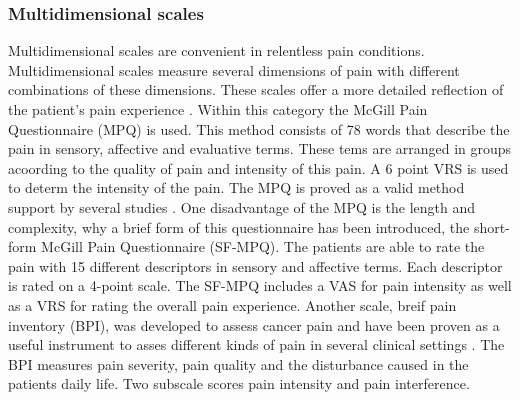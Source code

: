 \subsubsection{Multidimensional scales}
Multidimensional scales are convenient in relentless pain conditions. Multidimensional scales measure several dimensions of pain with different combinations of these dimensions. These scales offer a more detailed reflection of the patient's pain experience \cite{art and science}. Within this category the McGill Pain Questionnaire (MPQ) is used. This method consists of 78 words that describe the pain in sensory, affective and evaluative terms. These tems are arranged in groups acoording to the quality of pain and intensity of this pain. A 6 point VRS is used to determ the intensity of the pain. The MPQ is proved as a valid method support by several studies \cite{libro pain}.  One disadvantage of the MPQ is the length and complexity, why a brief form of this questionnaire has been introduced, the short-form McGill Pain Questionnaire (SF-MPQ). The patients are able to rate the pain with 15 different descriptors in sensory and affective terms. Each descriptor is rated on a 4-point scale. The SF-MPQ includes a VAS for pain intensity as well as a VRS for rating the overall pain experience. Another scale, breif pain inventory (BPI), was developed to assess cancer pain and have been proven as a useful instrument to asses different kinds of pain in several clinical settings \cite{libro pain}. The BPI measures pain severity, pain quality and the disturbance caused in the patients daily life. Two subscale scores pain intensity and pain interference.  


